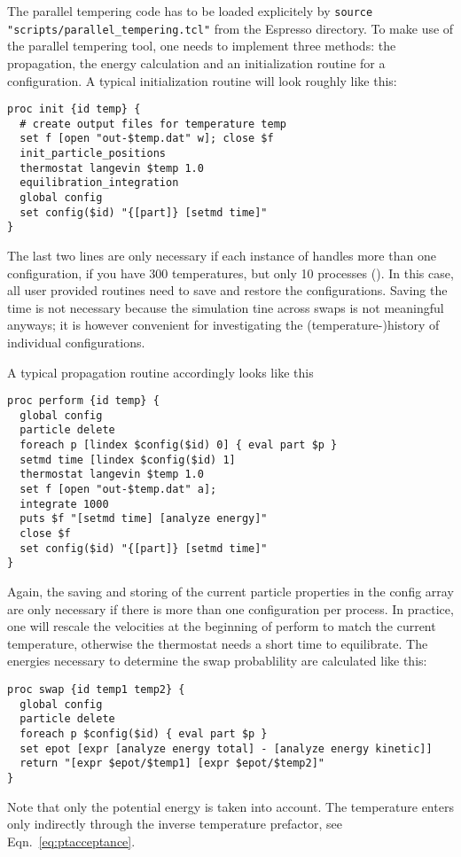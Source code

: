 The parallel tempering code has to be loaded explicitely by {\tt source
  "scripts/parallel_tempering.tcl"} from the Espresso directory. To make use of the parallel
tempering tool, one needs to implement three methods: the propagation, the energy calculation and
an initialization routine for a configuration. A typical initialization routine will look roughly
like this:
\begin{verbatim}
proc init {id temp} {
  # create output files for temperature temp
  set f [open "out-$temp.dat" w]; close $f
  init_particle_positions
  thermostat langevin $temp 1.0
  equilibration_integration
  global config
  set config($id) "{[part]} [setmd time]"
}
\end{verbatim}
The last two lines are only necessary if each instance of \es{} handles more than one
configuration, \eg if you have 300 temperatures, but only 10 \es{} processes
().  In this case, all
user provided routines need to save and restore the configurations. Saving the time is not
necessary because the simulation tine across swaps is not meaningful anyways; it is however
convenient for investigating the (temperature-)history of individual configurations.

A typical propagation routine accordingly looks like this
\begin{verbatim}
proc perform {id temp} {
  global config
  particle delete
  foreach p [lindex $config($id) 0] { eval part $p }
  setmd time [lindex $config($id) 1]
  thermostat langevin $temp 1.0
  set f [open "out-$temp.dat" a];
  integrate 1000
  puts $f "[setmd time] [analyze energy]"
  close $f
  set config($id) "{[part]} [setmd time]"
}
\end{verbatim}
Again, the saving and storing of the current particle properties in the config array are only
necessary if there is more than one configuration per process. In practice, one will rescale the
velocities at the beginning of perform to match the current temperature, otherwise the thermostat
needs a short time to equilibrate. The energies necessary to determine the swap probablility are
calculated like this:
\begin{verbatim}
proc swap {id temp1 temp2} {
  global config
  particle delete
  foreach p $config($id) { eval part $p }
  set epot [expr [analyze energy total] - [analyze energy kinetic]]
  return "[expr $epot/$temp1] [expr $epot/$temp2]"
}
\end{verbatim}
Note that only the potential energy is taken into account. The temperature enters only indirectly
through the inverse temperature prefactor, see Eqn.~\eqref{eq:ptacceptance}.

